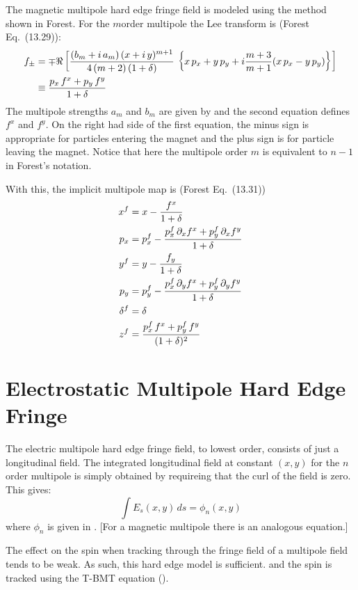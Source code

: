 The magnetic multipole hard edge fringe field is modeled using the method shown in
Forest\cite{b:forest}. For the $m$\Th order multipole the Lee transform 
is (Forest Eq.~(13.29)):
\begin{align}
  f_\pm &= \mp \Re \left[ \frac{(b_m + i \, a_m) \, 
    (x + i \, y)^{m+1}}{4 \, (m + 2) \, (1 + \delta)} \,
    \left\{ x \, p_x + y \, p_y + i \frac{m+3}{m+1} 
    (x \, p_x - y \, p_y) \right\} \right] \nonumber \\
  &\equiv \frac{p_x \, f^x + p_y \, f^y}{1 + \delta}
\end{align}
The multipole strengths $a_m$ and $b_m$ are given by 
and the second equation defines $f^x$ and $f^y$. On the right had side of the first
equation, the minus sign is appropriate for particles entering the magnet and the
plus sign is for particle leaving the magnet.
Notice that here the multipole order $m$ is equivalent to $n-1$ in Forest's notation.

With this, the implicit multipole map is (Forest Eq.~(13.31))
\begin{align}
  x^f &= x - \frac{f^x}{1 + \delta} \nonumber \\
  p_x &= p_x^f - \frac{p_x^f \, \partial_x f^x + p_y^f \, \partial_x f^y}{1 + \delta} \nonumber \\
  y^f &= y - \frac{f_y}{1 + \delta} \\
  p_y &= p_y^f - \frac{p_x^f \, \partial_y f^x + p_y^f \, \partial_y f^y}{1 + \delta} \nonumber \\
  \delta^f &= \delta \nonumber \\
  z^f &=\frac{p_x^f \, f^x + p_y^f \, f^y}{(1 + \delta)^2} \nonumber
\end{align}

\section{Electrostatic Multipole Hard Edge Fringe}
\label{s:spin.hard.fringe}

The electric multipole hard edge fringe field, to lowest order, consists of just a
longitudinal field. The integrated longitudinal field at constant $(x,y)$ for the $n$\Th
order multipole is simply obtained by requireing that the curl of the field is zero.
This gives:
\begin{equation}
  \int E_s(x,y) \, ds = \phi_n(x,y)
\end{equation}
where $\phi_n$ is given in . [For a magnetic multipole there is an analogous
equation.]

The effect on the spin when tracking through the fringe field of a multipole field tends
to be weak. As such, this hard edge model is sufficient.  and the spin is tracked using
the T-BMT equation ().

